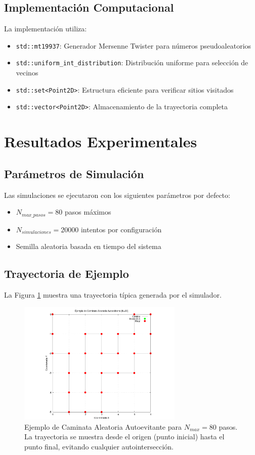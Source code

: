 \documentclass[11pt,a4paper]{article}
\begin{document}
\subsection{Implementación Computacional}
La implementación utiliza:
\begin{itemize}
    \item \texttt{std::mt19937}: Generador Mersenne Twister para números pseudoaleatorios
    \item \texttt{std::uniform\_int\_distribution}: Distribución uniforme para selección de vecinos
    \item \texttt{std::set<Point2D>}: Estructura eficiente para verificar sitios visitados
    \item \texttt{std::vector<Point2D>}: Almacenamiento de la trayectoria completa
\end{itemize}

\section{Resultados Experimentales}

\subsection{Parámetros de Simulación}
Las simulaciones se ejecutaron con los siguientes parámetros por defecto:
\begin{itemize}
    \item $N_{max\_pasos} = 80$ pasos máximos
    \item $N_{simulaciones} = 20000$ intentos por configuración
    \item Semilla aleatoria basada en tiempo del sistema
\end{itemize}

\subsection{Trayectoria de Ejemplo}
La Figura \ref{fig:saw_trayectoria} muestra una trayectoria típica generada por el simulador.

\begin{figure}[h!]
    \centering
    \includegraphics[width=0.7\textwidth]{../results/saw_plot_N80_trayectoria.png}
    \caption{Ejemplo de Caminata Aleatoria Autoevitante para $N_{max} = 80$ pasos. La trayectoria se muestra desde el origen (punto inicial) hasta el punto final, evitando cualquier autointersección.}
    \label{fig:saw_trayectoria}
\end{figure}
\end{document}
